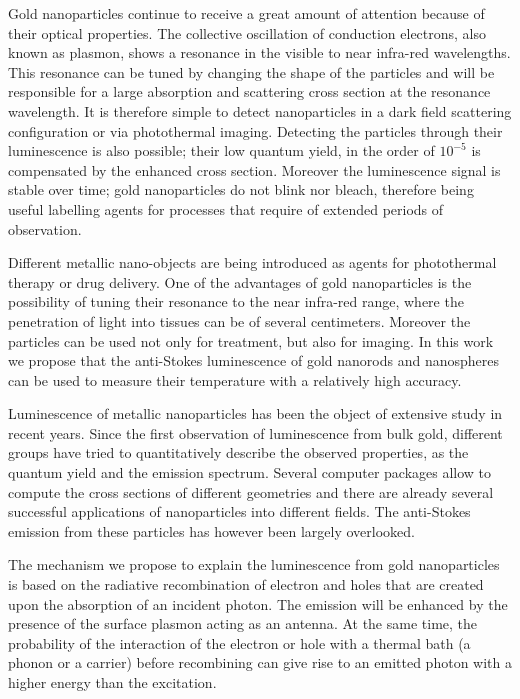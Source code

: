 \documentclass[journal=nalefd,manuscript=letter]{achemso}
\begin{document}
Gold nanoparticles continue to receive a great amount of attention because of
their optical properties\cite{Zijlstra2011}. The collective oscillation of
conduction electrons, also known as plasmon, shows a resonance in the visible to
near infra-red wavelengths. This resonance can be tuned by changing the shape of
the particles\cite{Carattino2016} and will be responsible for a large absorption
and scattering cross section at the resonance wavelength. It is therefore simple
to detect nanoparticles in a dark field scattering\cite{Hu2008} configuration or
via photothermal imaging\cite{Berciaud2006}. Detecting the particles through
their luminescence\cite{Tcherniak2011} is also possible; their low quantum
yield, in the order of $10^{-5}$\cite{Yorulmaz2012} is compensated by the
enhanced cross section. Moreover the luminescence signal is stable over time;
gold nanoparticles do not blink nor bleach, therefore being useful labelling
agents for processes that require of extended periods of observation.

Different metallic nano-objects are being introduced as agents for photothermal
therapy or drug delivery\cite{Kang2013}. One of the advantages of gold
nanoparticles is the possibility of tuning their resonance to the near infra-red
range, where the penetration of light into tissues can be of several
centimeters\cite{Huang2006,Gobin2007,Hirsch2003,ONeal2004,Li2013c,Huang2008}.
Moreover the particles can be used not only for treatment, but also for imaging.
In this work we propose that the anti-Stokes luminescence of gold nanorods and
nanospheres can be used to measure their temperature with a relatively high
accuracy.

Luminescence of metallic nanoparticles has been the object of extensive study in
recent years. Since the first observation of luminescence from bulk
gold\cite{Mooradian1969}, different groups have tried to quantitatively describe
the observed properties\cite{Mohamed2000,Beversluis2003a}, as the
quantum yield\cite{Fang2012,Rao2015,Yorulmaz2012,Cheng2015,Dulkeith2004} and the
emission spectrum\cite{Link2010}. Several computer packages\cite{Yurkin2011} allow to
compute the cross sections of different geometries and there are already several
successful applications of nanoparticles into different fields. The anti-Stokes
emission from these particles has however been largely overlooked.

The mechanism we propose to explain the luminescence from gold nanoparticles is
based on the radiative recombination of electron and holes that are created upon
the absorption of an incident photon\cite{Dulkeith2004,Mooradian1969}. The
emission will be enhanced by the presence of the surface plasmon acting as an
antenna\cite{Mohamed2000}. At the same time, the probability of the interaction
of the electron or hole with a thermal bath (a phonon or a carrier) before
recombining can give rise to an emitted photon with a higher energy than the
excitation\cite{Hodak2000,Giri2015,Arbouet2003a}.
\end{document}
